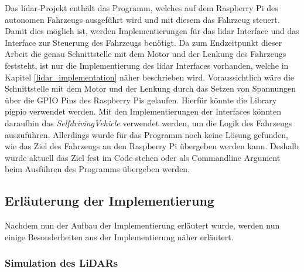 Das \ac{lidar}-Projekt enthält das Programm, welches auf dem Raspberry Pi des autonomen Fahrzeugs ausgeführt wird und mit diesem das Fahrzeug steuert. 
Damit dies möglich ist, werden Implementierungen für das \ac{lidar} Interface und das Interface zur Steuerung des Fahrzeugs benötigt. 
Da zum Endzeitpunkt dieser Arbeit die genau Schnittstelle mit dem Motor und der Lenkung des Fahrzeugs feststeht, 
ist nur die Implementierung des \ac{lidar} Interfaces vorhanden, welche in Kapitel \ref{lidar_implementation} näher beschrieben wird. 
Voraussichtlich wäre die Schnittstelle mit dem Motor und der Lenkung durch das Setzen von Spannungen über die GPIO Pins des Raspberry Pis gelaufen. 
Hierfür könnte die Library pigpio verwendet werden.  
Mit den Implementierungen der Interfaces könnten daraufhin das \textit{SelfdrivingVehicle} verwendet werden, um die Logik des Fahrzeugs auszuführen. 
Allerdings wurde für das Programm noch keine Lösung gefunden, wie das Ziel des Fahrzeugs an den Raspberry Pi übergeben werden kann. 
Deshalb würde aktuell das Ziel fest im Code stehen oder als Commandline Argument beim Ausführen des Programms übergeben werden. 

\subsection{Erläuterung der Implementierung}

Nachdem nun der Aufbau der Implementierung erläutert wurde, werden nun einige Besonderheiten aus der Implementierung näher erläutert. 

\subsubsection{Simulation des LiDARs}

